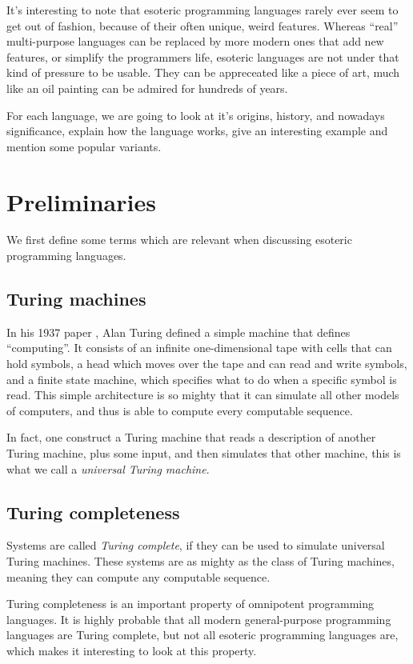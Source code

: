 \documentclass{sig-alternate}
\begin{document}
It's interesting to note that esoteric programming languages rarely ever seem to get out of fashion, because of their often unique, weird features. Whereas “real” multi-purpose languages can be replaced by more modern ones that add new features, or simplify the programmers life, esoteric languages are not under that kind of pressure to be usable. They can be appreceated like a piece of art, much like an oil painting can be admired for hundreds of years.

For each language, we are going to look at it's origins, history, and nowadays significance, explain how the language works, give an interesting example and mention some popular variants.

\section{Preliminaries}

We first define some terms which are relevant when discussing esoteric programming languages.

\subsection{Turing machines}

In his 1937 paper \cite{turing1937computable}, Alan Turing defined a simple machine that defines “computing”. It consists of an infinite one-dimensional tape with cells that can hold symbols, a head which moves over the tape and can read and write symbols, and a finite state machine, which specifies what to do when a specific symbol is read. This simple architecture is so mighty that it can simulate all other models of computers, and thus is able to compute every computable sequence.

In fact, one construct a Turing machine that reads a description of another Turing machine, plus some input, and then simulates that other machine, this is what we call a \emph{universal Turing machine}.

\subsection{Turing completeness}

Systems are called \emph{Turing complete}, if they can be used to simulate universal Turing machines. These systems are as mighty as the class of Turing machines, meaning they can compute any computable sequence.

Turing completeness is an important property of omnipotent programming languages. It is highly probable that all modern general-purpose programming languages are Turing complete, but not all esoteric programming languages are, which makes it interesting to look at this property.
\end{document}
